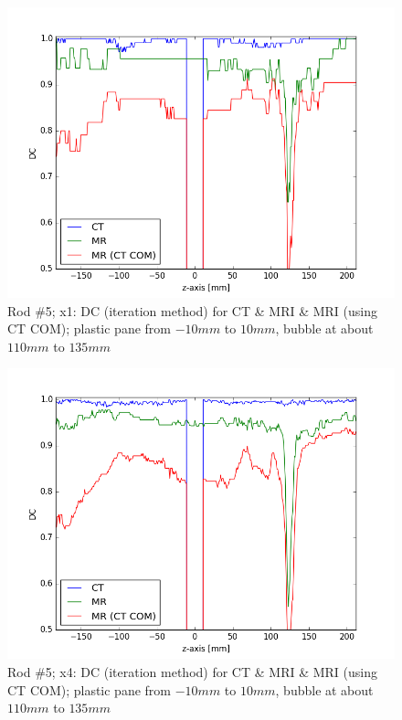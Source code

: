 \begin{figure}[!bth]
    \centering
    \includegraphics[scale=0.6]{../fig/python/ph2/dice/ph2_DC_x1_iter.png}
    \caption{Rod \#5; x1: DC (iteration method) for CT \& MRI \& MRI (using CT COM); plastic pane from $-10mm$ to $10mm$, bubble at about $110mm$ to $135mm$}
    \label{fig:ph2_DC_x1}
\end{figure}

\begin{figure}[!bth]
    \centering
    \includegraphics[scale=0.6]{../fig/python/ph2/dice/ph2_DC_x4_iter.png}
    \caption{Rod \#5; x4: DC (iteration method) for CT \& MRI \& MRI (using CT COM); plastic pane from $-10mm$ to $10mm$, bubble at about $110mm$ to $135mm$}
    \label{fig:ph2_DC_x4}
\end{figure}

